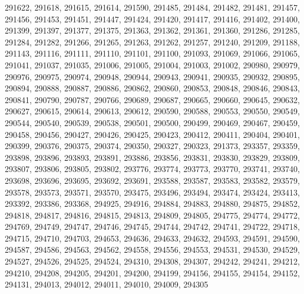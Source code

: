 \begin{appendix}
\begin{itemize}
     291622, 291618, 291615, 291614, 291590, 291485, 291484, 291482, 291481, 291457,\\
     291456, 291453, 291451, 291447, 291424, 291420, 291417, 291416, 291402, 291400,\\
     291399, 291397, 291377, 291375, 291363, 291362, 291361, 291360, 291286, 291285,\\
     291284, 291282, 291266, 291265, 291263, 291262, 291257, 291240, 291209, 291188,\\
     291143, 291116, 291111, 291110, 291101, 291100, 291093, 291069, 291066, 291065,\\
     291041, 291037, 291035, 291006, 291005, 291004, 291003, 291002, 290980, 290979,\\
     290976, 290975, 290974, 290948, 290944, 290943, 290941, 290935, 290932, 290895,\\
     290894, 290888, 290887, 290886, 290862, 290860, 290853, 290848, 290846, 290843,\\
     290841, 290790, 290787, 290766, 290689, 290687, 290665, 290660, 290645, 290632,\\
     290627, 290615, 290614, 290613, 290612, 290590, 290588, 290553, 290550, 290549,\\
     290544, 290540, 290539, 290538, 290501, 290500, 290499, 290469, 290467, 290459,\\
     290458, 290456, 290427, 290426, 290425, 290423, 290412, 290411, 290404, 290401,\\
     290399, 290376, 290375, 290374, 290350, 290327, 290323, 291373, 293357, 293359,\\
     293898, 293896, 293893, 293891, 293886, 293856, 293831, 293830, 293829, 293809,\\
     293807, 293806, 293805, 293802, 293776, 293774, 293773, 293770, 293741, 293740,\\
     293698, 293696, 293695, 293692, 293691, 293588, 293587, 293583, 293582, 293579,\\
     293578, 293573, 293571, 293570, 293475, 293496, 293494, 293474, 293424, 293413,\\
     293392, 293386, 293368, 294925, 294916, 294884, 294883, 294880, 294875, 294852,\\
     294818, 294817, 294816, 294815, 294813, 294809, 294805, 294775, 294774, 294772,\\
     294769, 294749, 294747, 294746, 294745, 294744, 294742, 294741, 294722, 294718,\\
     294715, 294710, 294703, 294653, 294636, 294633, 294632, 294593, 294591, 294590,\\
     294587, 294586, 294563, 294562, 294558, 294556, 294553, 294531, 294530, 294529,\\
     294527, 294526, 294525, 294524, 294310, 294308, 294307, 294242, 294241, 294212,\\
     294210, 294208, 294205, 294201, 294200, 294199, 294156, 294155, 294154, 294152,\\
     294131, 294013, 294012, 294011, 294010, 294009, 294305 
\end{itemize}






\end{appendix}
